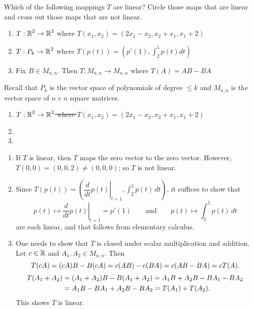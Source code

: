 \documentclass{ximera}
\author{Matthew Carr}
\begin{document}

\begin{exercise}\label{mc.exercise3}

Which of the following mappings $T$ are linear?  Circle those maps that are linear and cross out those maps that are not linear.

\begin{enumerate}
\item $T:\mbox{$\Bbb{R}$}^2\to\mbox{$\Bbb{R}$}^3$ where $T(x_1,x_2) = (2x_1 - x_2, x_2 + x_1, x_1 + 2)$
\item $T:P_k\to\mbox{$\Bbb{R}$}^2$ where $T(p(t)) = (p'(1), \int_2^5p(t)dt)$
\item Fix $B\in M_{n,n}$. Then $T:M_{n,n}\to M_{n,n}$ where $T(A) = AB-BA$
\end{enumerate}
Recall that $P_k$ is the vector space of polynomials of degree $\leq k$ and $M_{n,n}$ is the vector space of $n\times n$ square matrices. 
 
  
\begin{solution}

\ans \begin{enumerate}
\item \sout{$T:\mbox{$\Bbb{R}$}^2\to\mbox{$\Bbb{R}$}^3$ where $T(x_1,x_2) = (2x_1 - x_2, x_2 + x_1, x_1 + 2)$}
\item {}
\item {}
\end{enumerate}


\soln  
\begin{enumerate}
\item If $T$ is linear, then $T$ maps the zero vector to the zero vector.  However, $T(0,0)=(0,0,2)\ne (0,0,0)$; so $T$ is not linear.
\item Since $T(p(t))=\left(\left.\dfrac{d}{dt}p(t)\right|_{t=1},\int_{2}^{5}p(t)\,dt\right)$, it suffices to show that 
\[
p(t)\mapsto \left.\dfrac{d}{dt}p(t)\right|_{t=1}=p'(1)\qquad\text{and}\qquad p(t)\mapsto \int_{2}^{5}p(t)\,dt
\]
are each linear, and that follows from elementary calculus. 
\item One needs to show that $T$ is closed under scalar multiplication and addition.  Let $c\in\mbox{$\Bbb{R}$}$ and $A_1,A_2\in M_{n,n}$. Then 
\[
T(cA)=(cA)B-B(cA)=c(AB)-c(BA)=c(AB-BA) = cT(A)\ldotp
\] 
\begin{align*}
T(A_1+A_2)&=(A_1+A_2)B-B(A_1+A_2)=A_1 B+A_2 B-B A_1-BA_2\\
&=A_1 B-BA_1+A_2B-BA_2=T(A_1)+T(A_2)\ldotp
\end{align*}
This shows $T$ is linear.
\end{enumerate}

\end{solution}
\end{exercise}
\end{document}
